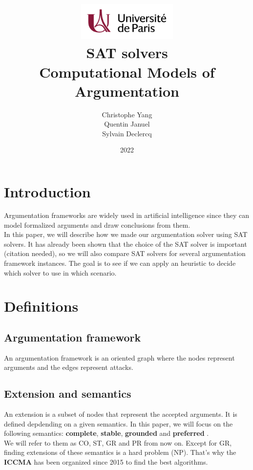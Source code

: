 \documentclass[11pt]{article}
\title{
	\centering
	\includegraphics[width=5cm]{univ-logo} \\
	\vspace{5cm}
	\textbf{SAT solvers} \\
	Computational Models of Argumentation
	\vspace{5cm}
}
\author{
    Christophe Yang \\
    Quentin Januel \\
    Sylvain Declercq
}
\date{2022}
\begin{document}
\maketitle
\newpage

\section{Introduction}
Argumentation frameworks are widely used in artificial intelligence since they can model formalized arguments and draw conclusions from them. \\
In this paper, we will describe how we made our argumentation solver using SAT solvers.
It has already been shown that the choice of the SAT solver is important (citation needed), so we will also compare SAT solvers for several argumentation framework instances. The goal is to see if we can apply an heuristic to decide which solver to use in which scenario.

\section{Definitions}

\subsection{Argumentation framework}
An argumentation framework is an oriented graph where the nodes represent arguments and the edges represent attacks.

\subsection{Extension and semantics}
An extension is a subset of nodes that represent the accepted arguments. It is defined depdending on a given semantics. In this paper, we will focus on the following semantics: \textbf{complete}, \textbf{stable}, \textbf{grounded} and \textbf{preferred} \cite{dung1995acceptability}. \\
We will refer to them as CO, ST, GR and PR from now on.
Except for GR, finding extensions of these semantics is a hard problem (NP). That's why the \textbf{ICCMA}\cite{iccma} has been organized since 2015 to find the best algorithms. \\ \\
\end{document}
